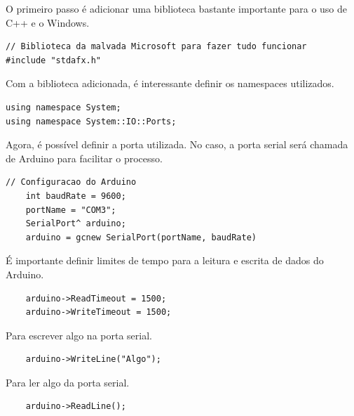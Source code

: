 O primeiro passo é adicionar uma biblioteca bastante importante para o uso de C++ e o Windows.
\begin{lstlisting}
// Biblioteca da malvada Microsoft para fazer tudo funcionar
#include "stdafx.h"
\end{lstlisting}

Com a biblioteca adicionada, é interessante definir os namespaces utilizados.
\begin{lstlisting}
using namespace System;
using namespace System::IO::Ports;
\end{lstlisting}

Agora, é possível definir a porta utilizada. No caso, a porta serial será chamada de Arduino para facilitar o processo.

\begin{lstlisting}
// Configuracao do Arduino
	int baudRate = 9600;
	portName = "COM3";
	SerialPort^ arduino;
	arduino = gcnew SerialPort(portName, baudRate)
\end{lstlisting}

É importante definir limites de tempo para a leitura e escrita de dados do Arduino.

\begin{lstlisting}
	arduino->ReadTimeout = 1500;
	arduino->WriteTimeout = 1500;
\end{lstlisting}

Para escrever algo na porta serial.

\begin{lstlisting}
	arduino->WriteLine("Algo");
\end{lstlisting}

Para ler algo da porta serial.

\begin{lstlisting}
	arduino->ReadLine();
\end{lstlisting}